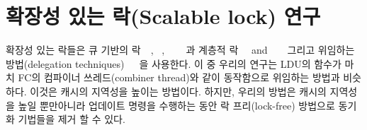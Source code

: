 \newpage
\section{확장성 있는 락(Scalable lock) 연구}
\label{sec:lockrelated}

확장성 있는 락들은 큐 기반의 락~\cite{MellorCrummey1991MCS}~\cite{Magnusson1994QLC},
~\cite{Wang2016BeMyGuest},
~\cite{Scott2013SS}
~\cite{Bueso2014MCS}~\cite{Bueso2015STP}과 계층적 락~\cite{Radovic2003HBL}~\cite{Chabbi2016CLL} and
~\cite{Luchangco2006HCQ}
~\cite{Chabbi2015HPL} 그리고 위임하는 방법(delegation
techniques)~\cite{Hendler2010FC}~\cite{Fatourou2012RCS}~\cite{Delegation2014}을 사용한다.
이 중 우리의 연구는 LDU의  함수가 마치 FC의 컴파이너 쓰레드(combiner thread)와 같이
동작함으로 위임하는 방법과 비슷하다. 이것은 캐시의 지역성을 높이는 방법이다.
하지만, 우리의 방법은 캐시의 지역성을 높일 뿐만아니라 업데이트 명령을
 수행하는 동안 락 프리(lock-free) 방법으로 동기화 기법들을 제거 할 수 있다. 


